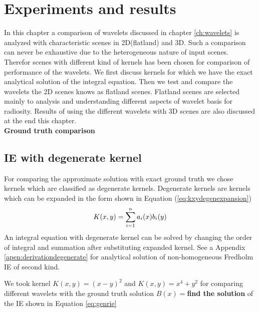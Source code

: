 \chapter{Experiments and results}
In this chapter a comparison of wavelets discussed in chapter  \ref{ch:wavelets} is analyzed with characteristic scenes in 2D(flatland) and 3D. Such a comparison can never be exhaustive due to the heterogeneous nature of input scenes. Therefor scenes with different kind of kernels has been chosen for comparison of performance of the wavelets. We first discuss kernels for which we have the exact analytical solution of the integral equation. Then we test and compare the wavelets the 2D scenes knows as flatland scenes. Flatland scenes are selected mainly to analysis and understanding different aspects of wavelet basis for radiosity. Results of using the different wavelets with 3D scenes are also discussed at the end this chapter. \\

{\bf Ground truth comparison}\\
\section{IE with degenerate kernel}
For comparing the approximate solution with exact ground truth we chose kernels which are classified as degenerate kernels. Degenerate kernels are kernels which can be expanded in the form shown in Equation (\ref{eq:kxydegenexpansion})
\begin{equation} \label{eq:kxydegen}
K(x,y) = \sum\limits_{i=1}^na_i(x)b_i(y) \\ 
\end{equation}
An integral equation with degenerate kernel can be solved by changing the order of integral and summation after substituting expanded kernel. See a
Appendix \ref{apen:derivationdegenerate} for analytical solution of non-homogeneous Fredholm IE of second kind. 

We took kernel $K(x,y)=(x-y)^2$ and $K(x,y)=x^4+y^2$ for comparing different wavelets with the ground truth solution $B(x)=${\bf find the solution} of the IE shown in Equation \ref{eq:genrie}

